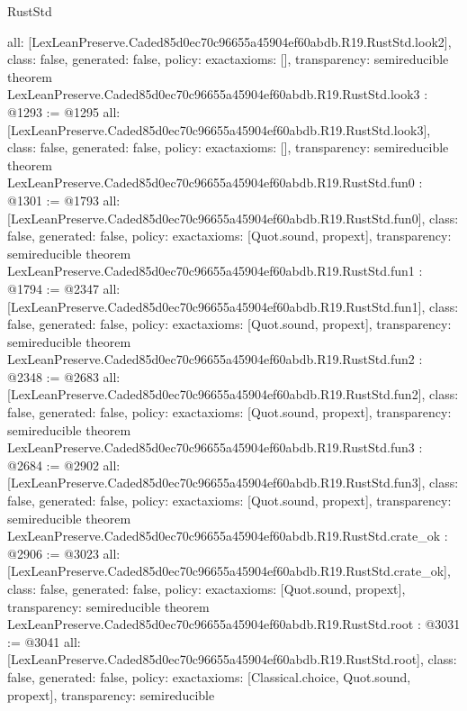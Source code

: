 \begin{lexlean}{RustStd}
\begin{coremodule}
{  all: [LexLeanPreserve.Caded85d0ec70c96655a45904ef60abdb.R19.RustStd.look2],
  class: false,
  generated: false,
  policy: exact{axioms: []},
  transparency: semireducible
}
theorem LexLeanPreserve.Caded85d0ec70c96655a45904ef60abdb.R19.RustStd.look3 : @1293 := @1295 {
  all: [LexLeanPreserve.Caded85d0ec70c96655a45904ef60abdb.R19.RustStd.look3],
  class: false,
  generated: false,
  policy: exact{axioms: []},
  transparency: semireducible
}
theorem LexLeanPreserve.Caded85d0ec70c96655a45904ef60abdb.R19.RustStd.fun0 : @1301 := @1793 {
  all: [LexLeanPreserve.Caded85d0ec70c96655a45904ef60abdb.R19.RustStd.fun0],
  class: false,
  generated: false,
  policy: exact{axioms: [Quot.sound, propext]},
  transparency: semireducible
}
theorem LexLeanPreserve.Caded85d0ec70c96655a45904ef60abdb.R19.RustStd.fun1 : @1794 := @2347 {
  all: [LexLeanPreserve.Caded85d0ec70c96655a45904ef60abdb.R19.RustStd.fun1],
  class: false,
  generated: false,
  policy: exact{axioms: [Quot.sound, propext]},
  transparency: semireducible
}
theorem LexLeanPreserve.Caded85d0ec70c96655a45904ef60abdb.R19.RustStd.fun2 : @2348 := @2683 {
  all: [LexLeanPreserve.Caded85d0ec70c96655a45904ef60abdb.R19.RustStd.fun2],
  class: false,
  generated: false,
  policy: exact{axioms: [Quot.sound, propext]},
  transparency: semireducible
}
theorem LexLeanPreserve.Caded85d0ec70c96655a45904ef60abdb.R19.RustStd.fun3 : @2684 := @2902 {
  all: [LexLeanPreserve.Caded85d0ec70c96655a45904ef60abdb.R19.RustStd.fun3],
  class: false,
  generated: false,
  policy: exact{axioms: [Quot.sound, propext]},
  transparency: semireducible
}
theorem LexLeanPreserve.Caded85d0ec70c96655a45904ef60abdb.R19.RustStd.crate_ok : @2906 := @3023 {
  all: [LexLeanPreserve.Caded85d0ec70c96655a45904ef60abdb.R19.RustStd.crate_ok],
  class: false,
  generated: false,
  policy: exact{axioms: [Quot.sound, propext]},
  transparency: semireducible
}
theorem LexLeanPreserve.Caded85d0ec70c96655a45904ef60abdb.R19.RustStd.root : @3031 := @3041 {
  all: [LexLeanPreserve.Caded85d0ec70c96655a45904ef60abdb.R19.RustStd.root],
  class: false,
  generated: false,
  policy: exact{axioms: [Classical.choice, Quot.sound, propext]},
  transparency: semireducible
}


\end{coremodule}
\end{lexlean}
